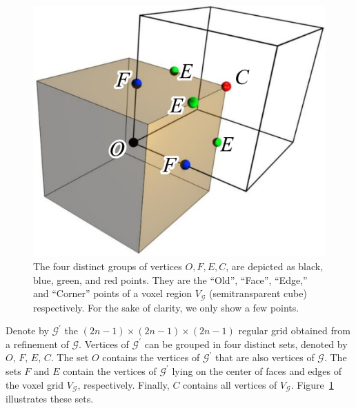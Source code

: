 \begin{figure}[t]
\centering
\includegraphics[width=0.35\linewidth]{chapter3/figures/voxel.pdf}
\caption{The four distinct groups of vertices $O, F, E, C$, are
  depicted as black, blue, green, and red points. They are the ``Old'',
  ``Face'', ``Edge,'' and ``Corner'' points of a voxel region
  $V_\mathcal{G}$ (semitransparent cube) respectively. For the sake of
  clarity, we only show a few points.}  
\label{fig:voxelgrid}
\end{figure}


Denote by $\mathcal{G}^\prime$ the $(2n-1)\times (2n-1) \times (2n-1)$ regular grid
obtained from a refinement of $\mathcal{G}$.
Vertices of $\mathcal{G}^\prime$ can be grouped in four distinct sets,
denoted by $O$, $F$, $E$, $C$. The set $O$ contains the vertices of
$\mathcal{G}^\prime$ that are also vertices of $\mathcal{G}$. The sets
$F$ and $E$ contain the vertices of $\mathcal{G}^\prime$ lying on the
center of faces and edges of the voxel grid $V_{\mathcal{G}}$,
respectively. Finally, $C$ contains all vertices of $V_{\mathcal{G}}$.
Figure~\ref{fig:voxelgrid} illustrates these sets.

